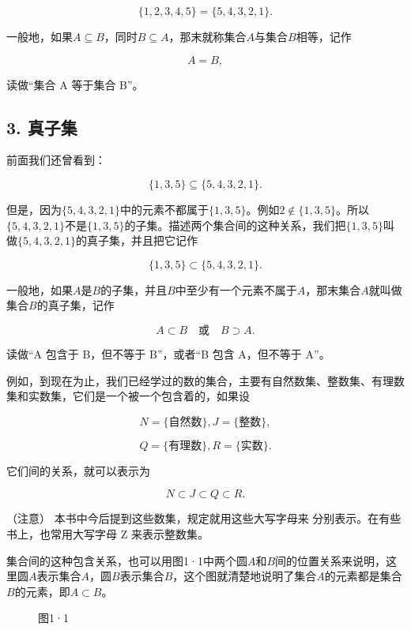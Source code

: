 \[
\{1, 2, 3, 4, 5 \} = \{5, 4, 3, 2, 1 \}.
\]

一般地，如果\(A \subseteq B\)，同时\(B \subseteq A\)，那末就称集合\(A\)与集合\(B\)相等，记作

\[
A = B,
\]

读做``集合 A 等于集合 B''。

\subsection{3. 真子集}

前面我们还曾看到：

\[
\{1, 3, 5 \} \subseteq \{5, 4, 3, 2, 1 \}.
\]

但是，因为\(\{5, 4, 3, 2, 1\}\)中的元素不都属于\(\{1, 3, 5\}\)。例如\(2 \notin \{1, 3, 5\}\)。所以\(\{5, 4, 3, 2, 1\}\)不是\(\{1, 3, 5\}\)的子集。描述两个集合间的这种关系，我们把\(\{1, 3, 5\}\)叫做\(\{5, 4, 3, 2, 1\}\)的真子集，并且把它记作

\[
\{1, 3, 5 \} \subset \{5, 4, 3, 2, 1 \}.
\]

一般地，如果\(A\)是\(B\)的子集，并且\(B\)中至少有一个元素不属于\(A\)，那末集合\(A\)就叫做集合\(B\)的真子集，记作

\[
A \subset B \quad \text{或} \quad B \supset A.
\]

读做``A 包含于 B，但不等于 B''，或者``B 包含 A，但不等于 A''。

例如，到现在为止，我们已经学过的数的集合，主要有自然数集、整数集、有理数集和实数集，它们是一个被一个包含着的，如果设

\[
N = \{\text{自然数} \}, J = \{\text{整数} \},
\]

\[
Q = \{\text{有理数} \}, R = \{\text{实数} \}.
\]

它们间的关系，就可以表示为

\[
N \subset J \subset Q \subset R.
\]

（注意） 本书中今后提到这些数集，规定就用这些大写字母来
分别表示。在有些书上，也常用大写字母 Z 来表示整数集。

集合间的这种包含关系，也可以用图1·1中两个圆\(A\)和\(B\)间的位置关系来说明，这里圆\(A\)表示集合\(A\)，圆\(B\)表示集合\(B\)，这个图就清楚地说明了集合\(A\)的元素都是集合\(B\)的元素，即\(A \subset B\)。

\begin{figure}
\centering
\caption{图1·1}
\end{figure}


